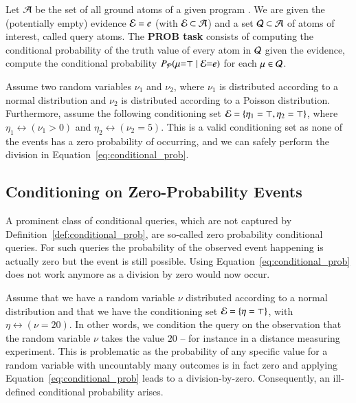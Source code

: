 \begin{definition}
\label{def:prob_task}
Let $\mathcal{A}$ be the set of all ground atoms of a given \dcproblogsty program \dcpprogram.
We are given the (potentially empty) evidence $\mathcal{E}=e$ (with $\mathcal{E} \subset \mathcal{A}$)
and a set $\mathcal{Q} \subset \mathcal{A}$ of atoms of interest, called
query atoms.
The {\bf PROB task} consists of computing the conditional probability of the truth value of every atom in $\mathcal{Q}$ given the evidence, \ie compute the conditional probability $P_{\mathcal{P}} (\mu {=} \top \mid \mathcal{E} {=} e)$ for each $\mu \in \mathcal{Q}$.
\end{definition}

\begin{example}
    Assume two random variables $\nu_1$ and $\nu_2$, where $\nu_1$ is distributed according to a normal distribution and $\nu_2$ is distributed according to a Poisson distribution. Furthermore, assume the following conditioning set $\mathcal{E}= \{\eta_1=\top, \eta_2=\top \}$, where $\eta_1 \leftrightarrow (\nu_1>0)$ and $\eta_2 \leftrightarrow (\nu_2=5)$. This is a valid conditioning set as none of the events has a zero probability of occurring, and we can safely perform the division in Equation~\ref{eq:conditional_prob}.
\end{example}

\subsection{Conditioning on  Zero-Probability Events}

A prominent class of conditional queries, which are not captured by Definition~\ref{def:conditional_prob}, are so-called  zero probability conditional queries. For such queries the probability of the observed event happening is actually zero but the event is still possible. Using Equation~\ref{eq:conditional_prob} does not work anymore as a division by zero would now occur.

\begin{example}
    Assume that we have a random variable $\nu$ distributed according to a normal distribution and that we have the conditioning set $\mathcal{E}= \{ \eta=\top \} $, with $\eta\leftrightarrow (\nu=20)$. In other words, we condition the query on the observation that the random variable $\nu$ takes the value $20$ -- for instance in a distance measuring experiment. This is problematic as the probability of any specific value for a random variable with uncountably many outcomes is in fact zero and applying Equation~\ref{eq:conditional_prob} leads to a division-by-zero. Consequently,  an ill-defined conditional probability arises.
\end{example}

